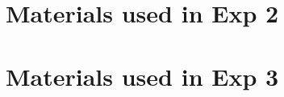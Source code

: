 \documentclass[11pt,fleqn]{article}
\newcommand{\6}{\mbox{$[\hspace*{-.6mm}[$}}
\newcommand{\9}{\mbox{$]\hspace*{-.6mm}]$}}
\begin{document}
\clearpage

\section{Materials used in Exp 2}\label{a-exp2}

\section{Materials used in Exp 3}\label{a-exp3}



\end{document}
